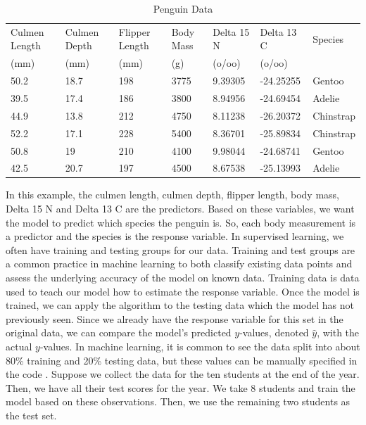 \documentclass[12pt]{article}
\begin{document}
\begin{table}[h]
    \centering
    \begin{tabular}{p{1.8cm}p{1.8cm}p{1.8cm}p{1.8cm}p{1.8cm}p{1.8cm}p{1.8cm}}
         Culmen Length & Culmen Depth & Flipper Length & Body Mass & Delta 15 N & Delta 13 C & Species \\
         (mm) & (mm) & (mm) & (g) & (o/oo) & (o/oo) \\
         \hline
         50.2 & 18.7 & 198 & 3775 & 9.39305 & -24.25255 & Gentoo \\
         39.5 & 17.4 & 186 & 3800 & 8.94956 & -24.69454 & Adelie \\
         44.9 & 13.8 & 212 & 4750 & 8.11238 & -26.20372 & Chinstrap \\
         52.2 & 17.1 & 228 & 5400 & 8.36701 & -25.89834 & Chinstrap \\
         50.8 & 19 & 210 & 4100 & 9.98044 & -24.68741 & Gentoo \\
         42.5 & 20.7 & 197 & 4500 & 8.67538 & -25.13993 & Adelie
    \end{tabular}
    \caption{Penguin Data}
    \label{table_penguin_data}
\end{table}

In this example, the culmen length, culmen depth, flipper length, body mass, Delta 15 N and Delta 13 C are the predictors. Based on these variables, we want the model to predict which species the penguin is. So, each body measurement is a predictor and the species is the response variable. In supervised learning, we often have training and testing groups for our data. Training and test groups are a common practice in machine learning to both classify existing data points and assess the underlying accuracy of the model on known data. Training data is data used to teach our model how to estimate the response variable. Once the model is trained, we can apply the algorithm to the testing data which the model has not previously seen. Since we already have the response variable for this set in the original data, we can compare the model's predicted $y$-values, denoted $\hat y$, with the actual $y$-values. In machine learning, it is common to see the data split into about 80\% training and 20\% testing data, but these values can be manually specified in the code \cite{trainingvtest}. Suppose we collect the data for the ten students at the end of the year. Then, we have all their test scores for the year. We take 8 students and train the model based on these observations. Then, we use the remaining two students as the test set. 
\end{document}
